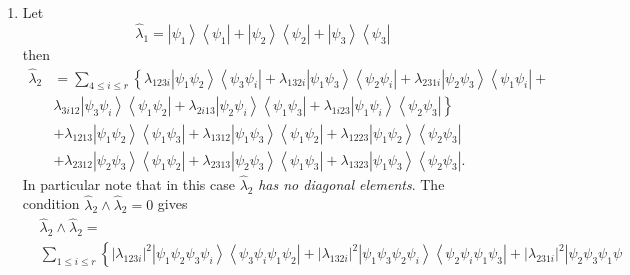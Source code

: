 \documentclass[aps,preprint]{revtex4}%
\begin{document}
\begin{enumerate}
\item Let
\begin{equation}
\hat{\lambda}_{1}=\left\vert \psi_{1}\right\rangle \left\langle \psi
_{1}\right\vert +\left\vert \psi_{2}\right\rangle \left\langle \psi
_{2}\right\vert +\left\vert \psi_{3}\right\rangle \left\langle \psi
_{3}\right\vert
\end{equation}
then
\begin{align}
\hat{\lambda}_{2}  &  =\sum_{4\leq i\leq r}\left\{  \lambda_{123i}\left\vert
\psi_{1}\psi_{2}\right\rangle \left\langle \psi_{3}\psi_{i}\right\vert
+\lambda_{132i}\left\vert \psi_{1}\psi_{3}\right\rangle \left\langle \psi
_{2}\psi_{i}\right\vert +\lambda_{231i}\left\vert \psi_{2}\psi_{3}%
\right\rangle \left\langle \psi_{1}\psi_{i}\right\vert +\right. \nonumber\\
&  \left.  \lambda_{3i12}\left\vert \psi_{3}\psi_{i}\right\rangle \left\langle
\psi_{1}\psi_{2}\right\vert +\lambda_{2i13}\left\vert \psi_{2}\psi
_{i}\right\rangle \left\langle \psi_{1}\psi_{3}\right\vert +\lambda
_{1i23}\left\vert \psi_{1}\psi_{i}\right\rangle \left\langle \psi_{2}\psi
_{3}\right\vert \right\} \nonumber\\
&  +\lambda_{1213}\left\vert \psi_{1}\psi_{2}\right\rangle \left\langle
\psi_{1}\psi_{3}\right\vert +\lambda_{1312}\left\vert \psi_{1}\psi
_{3}\right\rangle \left\langle \psi_{1}\psi_{2}\right\vert +\lambda
_{1223}\left\vert \psi_{1}\psi_{2}\right\rangle \left\langle \psi_{2}\psi
_{3}\right\vert \nonumber\\
&  +\lambda_{2312}\left\vert \psi_{2}\psi_{3}\right\rangle \left\langle
\psi_{1}\psi_{2}\right\vert +\lambda_{2313}\left\vert \psi_{2}\psi
_{3}\right\rangle \left\langle \psi_{1}\psi_{3}\right\vert +\lambda
_{1323}\left\vert \psi_{1}\psi_{3}\right\rangle \left\langle \psi_{2}\psi
_{3}\right\vert .
\end{align}
In particular note that in this case $\hat{\lambda}_{2}$ \emph{has no diagonal
elements}. The condition $\hat{\lambda}_{2}\wedge\hat{\lambda}_{2}=0$ gives
\begin{align}
&  \hat{\lambda}_{2}\wedge\hat{\lambda}_{2}=\nonumber\\
&  \sum_{1\leq i\leq r}\left\{  \left\vert \lambda_{123i}\right\vert
^{2}\left\vert \psi_{1}\psi_{2}\psi_{3}\psi_{i}\right\rangle \left\langle
\psi_{3}\psi_{i}\psi_{1}\psi_{2}\right\vert +\left\vert \lambda_{132i}%
\right\vert ^{2}\left\vert \psi_{1}\psi_{3}\psi_{2}\psi_{i}\right\rangle
\left\langle \psi_{2}\psi_{i}\psi_{1}\psi_{3}\right\vert +\left\vert
\lambda_{231i}\right\vert ^{2}\left\vert \psi_{2}\psi_{3}\psi_{1}\psi

\end{align}
\end{enumerate}
\end{document}
